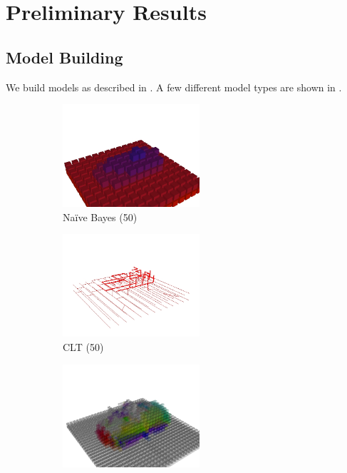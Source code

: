 \section{Preliminary Results}\label{sec:results}

\subsection{Model Building}

We build models as described in . A few different model
types are shown in .

\begin{figure}
  \centering
  \begin{subfigure}[]{0.3\linewidth}
    \centering
    \includegraphics[height=1.5in]{figures/car_marginal.jpg}
    \caption{Na\"ive Bayes (\unit{50}{\cm})}
    \label{fig:nb}
  \end{subfigure}
  \begin{subfigure}[]{0.3\linewidth}
    \centering
    \includegraphics[height=1.5in]{figures/car_tree.jpg}
    \caption{\ac{CLT} (\unit{50}{\cm})}
    \label{fig:clt}
  \end{subfigure}
  \begin{subfigure}[]{0.3\linewidth}
    \centering
    \includegraphics[height=1.5in]{figures/car_fm.jpg}

\end{subfigure}
\end{figure}
